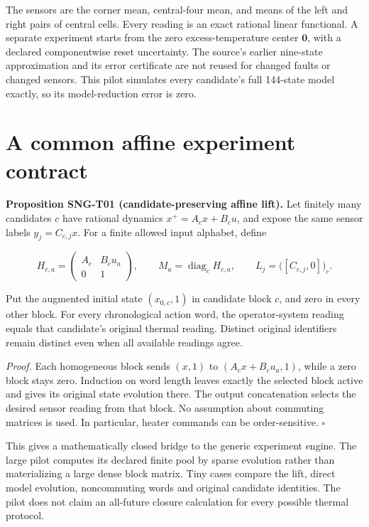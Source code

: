 \documentclass[
  11pt,
  a4paper,
]{report}
\begin{document}
The sensors are the corner mean, central-four mean, and means of the
left and right pairs of central cells. Every reading is an exact
rational linear functional. A separate experiment starts from the zero
excess-temperature center \(\mathbf0\), with a declared componentwise
reset uncertainty. The source's earlier nine-state approximation and its
error certificate are not reused for changed faults or changed sensors.
This pilot simulates every candidate's full 144-state model exactly, so
its model-reduction error is zero.

\hypertarget{a-common-affine-experiment-contract}{%
\section{A common affine experiment
contract}\label{a-common-affine-experiment-contract}}

\textbf{Proposition SNG-T01 (candidate-preserving affine lift).} Let
finitely many candidates \(c\) have rational dynamics \(x^+=A_cx+B_cu\),
and expose the same sensor labels \(y_j=C_{c,j}x\). For a finite allowed
input alphabet, define

\[
H_{c,a}=\begin{pmatrix}A_c&B_cu_a\\0&1\end{pmatrix},
\qquad M_a=\operatorname{diag}_c H_{c,a},
\qquad L_j=\bigl([C_{c,j},0]\bigr)_c.
\]

Put the augmented initial state \((x_{0,c},1)\) in candidate block
\(c\), and zero in every other block. For every chronological action
word, the operator-system reading equals that candidate's original
thermal reading. Distinct original identifiers remain distinct even when
all available readings agree.

\emph{Proof.} Each homogeneous block sends \((x,1)\) to
\((A_cx+B_cu_a,1)\), while a zero block stays zero. Induction on word
length leaves exactly the selected block active and gives its original
state evolution there. The output concatenation selects the desired
sensor reading from that block. No assumption about commuting matrices
is used. In particular, heater commands can be order-sensitive.
\(\square\)

This gives a mathematically closed bridge to the generic experiment
engine. The large pilot computes its declared finite pool by sparse
evolution rather than materializing a large dense block matrix. Tiny
cases compare the lift, direct model evolution, noncommuting words and
original candidate identities. The pilot does not claim an all-future
closure calculation for every possible thermal protocol.
\end{document}
